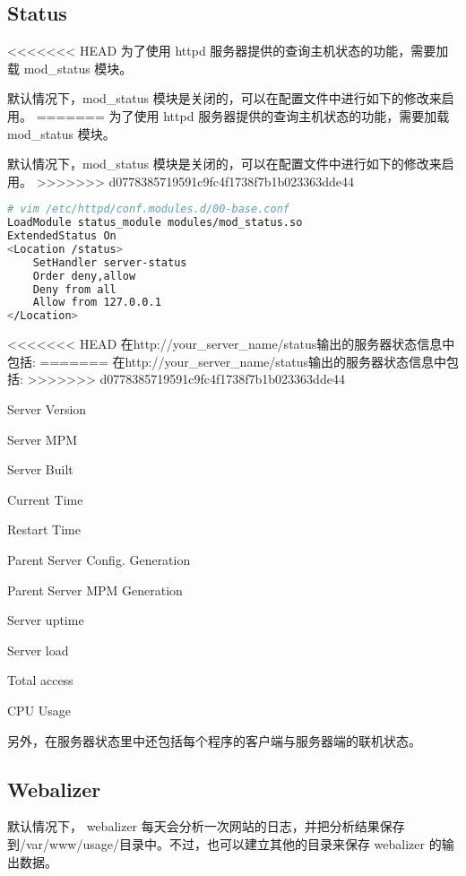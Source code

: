 \subsection{Status}


<<<<<<< HEAD
为了使用 httpd 服务器提供的查询主机状态的功能，需要加载 mod_status 模块。

默认情况下，mod_status 模块是关闭的，可以在配置文件中进行如下的修改来启用。
=======
为了使用 httpd 服务器提供的查询主机状态的功能，需要加载 mod\_status 模块。

默认情况下，mod\_status 模块是关闭的，可以在配置文件中进行如下的修改来启用。
>>>>>>> d0778385719591c9fc4f1738f7b1b023363dde44



\begin{lstlisting}[language=bash]
# vim /etc/httpd/conf.modules.d/00-base.conf
LoadModule status_module modules/mod_status.so
ExtendedStatus On
<Location /status>
	SetHandler server-status
	Order deny,allow
	Deny from all
	Allow from 127.0.0.1
</Location>
\end{lstlisting}

<<<<<<< HEAD
在http://your_server_name/status输出的服务器状态信息中包括:
=======
在http://your\_server\_name/status输出的服务器状态信息中包括:
>>>>>>> d0778385719591c9fc4f1738f7b1b023363dde44

\begin{compactitem}
\item Server Version
\item Server MPM
\item Server Built
\item Current Time
\item Restart Time
\item Parent Server Config. Generation
\item Parent Server MPM Generation
\item Server uptime
\item Server load
\item Total access
\item CPU Usage
\end{compactitem}

另外，在服务器状态里中还包括每个程序的客户端与服务器端的联机状态。

\subsection{Webalizer}


默认情况下， webalizer 每天会分析一次网站的日志，并把分析结果保存到/var/www/usage/目录中。不过，也可以建立其他的目录来保存 webalizer 的输出数据。







